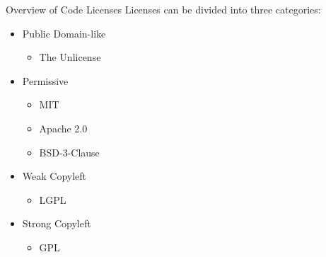 \documentclass[compress,aspectratio=169]{beamer}
\begin{document}
	\begin{frame}{Overview of Code Licenses}
    Licenses can be divided into three categories:
		\begin{itemize}
      \item Public Domain-like
        \begin{itemize}
          \item The Unlicense
        \end{itemize}
			\item Permissive
        \begin{itemize}
          \item MIT
          \item Apache 2.0
          \item BSD-3-Clause
        \end{itemize}
      \item Weak Copyleft
        \begin{itemize}
          \item LGPL
        \end{itemize}
      \item Strong Copyleft
        \begin{itemize}
          \item GPL
        \end{itemize}
		\end{itemize}
	\end{frame}
\end{document}
